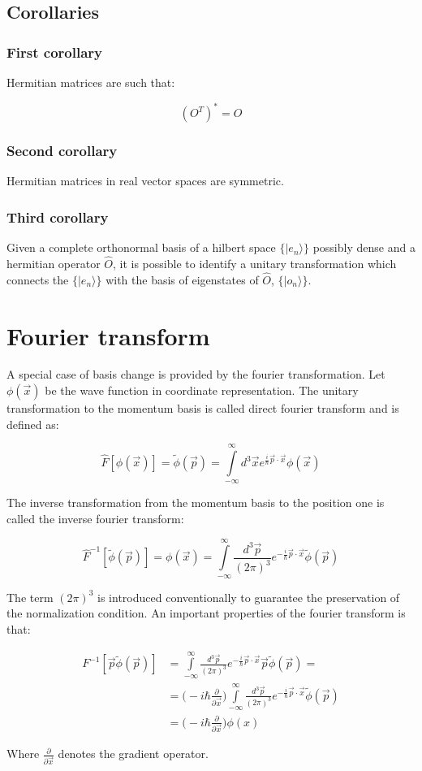 	\subsection{Corollaries}

		\subsubsection{First corollary}
		Hermitian matrices are such that:

		$$(O^T)^* = O$$

		\subsubsection{Second corollary}
		Hermitian matrices in real vector spaces are symmetric.

		\subsubsection{Third corollary}
		Given a complete orthonormal basis of a hilbert space $\{|e_n\rangle\}$ possibly dense and a hermitian operator $\hat{O}$, it is possible to identify a unitary transformation which connects the $\{|e_n\rangle\}$ with the basis of eigenstates of $\hat{O}$, $\{|o_n\rangle\}$.

\section{Fourier transform}
A special case of basis change is provided by the fourier transformation.
Let $\phi(\vec{x})$ be the wave function in coordinate representation.
The unitary transformation to the momentum basis is called direct fourier transform and is defined as:

$$\hat{F}[\phi(\vec{x})] = \tilde{\phi}(\vec{p}) = \int\limits_{-\infty}^\infty d^3\vec{x}e^{\frac{i}{\hbar}\vec{p}\cdot\vec{x}}\phi(\vec{x})$$

The inverse transformation from the momentum basis to the position one is called the inverse fourier transform:

$$\hat{F}^{-1}[\tilde{\phi}(\vec{p})] = \phi(\vec{x}) = \int\limits_{-\infty}^\infty \frac{d^3\vec{p}}{(2\pi)^3}e^{-\frac{i}{\hbar}\vec{p}\cdot\vec{x}}\tilde{\phi}(\vec{p})$$

The term $(2\pi)^3$ is introduced conventionally to guarantee the preservation of the normalization condition.
An important properties of the fourier transform is that:

\begin{align*}
	F^{-1}[\vec{p}\tilde{\phi}(\vec{p})] &= \int\limits_{-\infty}^\infty \frac{d^3\vec{p}}{(2\pi)^3}e^{-\frac{i}{\hbar}\vec{p}\cdot\vec{x}}\vec{p}\tilde{\phi}(\vec{p})=\\
					     & = \biggl(-i\hbar\frac{\partial}{\partial \vec{x}}\biggr)\int\limits_{-\infty}^\infty \frac{d^3\vec{p}}{(2\pi)^3}e^{-\frac{i}{\hbar}\vec{p}\cdot\vec{x}}\tilde{\phi}(\vec{p})\\
					     & = \biggl(-i\hbar\frac{\partial}{\partial \vec{x}}\biggr)\phi(x)
\end{align*}

Where $\frac{\partial}{\partial\vec{x}}$ denotes the gradient operator.
